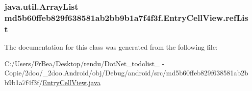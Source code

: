 \hypertarget{classmd5b60ffeb829f638581ab2bb9b1a7f4f3f_1_1_entry_cell_view_7768036a1df03e5a8aa5d75e1c5de7f6}{
\subsubsection[{refList}]{\setlength{\rightskip}{0pt plus 5cm}java.util.ArrayList {\bf md5b60ffeb829f638581ab2bb9b1a7f4f3f.EntryCellView.refList}}}
\label{classmd5b60ffeb829f638581ab2bb9b1a7f4f3f_1_1_entry_cell_view_7768036a1df03e5a8aa5d75e1c5de7f6}




The documentation for this class was generated from the following file:\begin{CompactItemize}
\item 
C:/Users/FrBea/Desktop/rendu/DotNet\_\-todolist\_ - Copie/2doo/\_\-2doo.Android/obj/Debug/android/src/md5b60ffeb829f638581ab2bb9b1a7f4f3f/\hyperlink{_entry_cell_view_8java}{EntryCellView.java}\end{CompactItemize}
